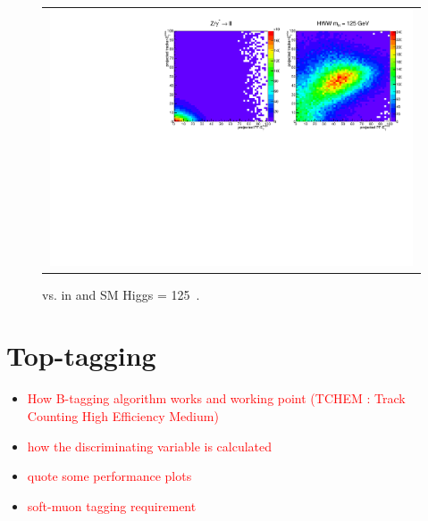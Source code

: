 %
\begin{figure}[htp] 
\centering 
\begin{tabular}{c} 
\includegraphics[width=0.99\textwidth]{figures/2dmet.pdf} 
\end{tabular} 
\caption{\pmet{} vs. \ptrkmet{} in \dyll{} and SM Higgs \mHi = 125~\GeV.}
\label{fig:2dmet} 
\end{figure}  

\section{ Top-tagging }
\begin{itemize}
\item \textcolor{red}{How B-tagging algorithm works and working point
      (TCHEM : Track Counting High Efficiency Medium)}
\item \textcolor{red}{how the discriminating variable is calculated }
\item \textcolor{red}{quote some performance plots }
\item \textcolor{red}{soft-muon tagging requirement }
\end{itemize}

